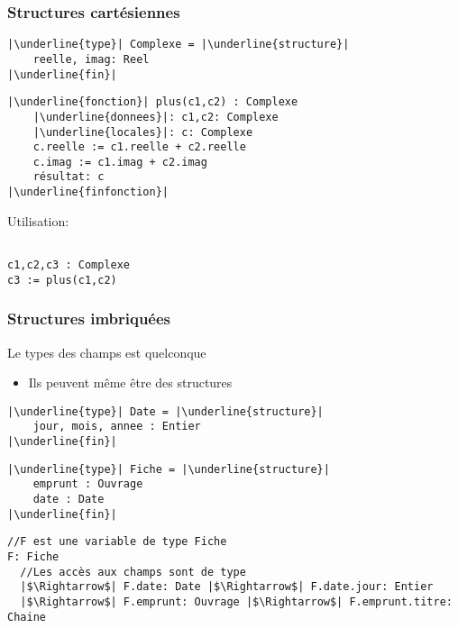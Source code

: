 \documentclass[table,handout,tikz,12pt,svgnames]{beamer}
\begin{document}
\begin{frame}[fragile=singleslide]
	\frametitle{Structures cartésiennes}
	\begin{verbatim}
|\underline{type}| Complexe = |\underline{structure}|
	reelle, imag: Reel
|\underline{fin}|
	\end{verbatim}
	\vspace{-0.9cm} \myline  \vspace{-0.7cm}	
	\begin{verbatim}
|\underline{fonction}| plus(c1,c2) : Complexe
	|\underline{donnees}|: c1,c2: Complexe
	|\underline{locales}|: c: Complexe
	c.reelle := c1.reelle + c2.reelle
	c.imag := c1.imag + c2.imag
	résultat: c
|\underline{finfonction}|
	\end{verbatim}			
	\vspace{-0.9cm} \myline  \vspace{-0.5cm}	
Utilisation:	
	\begin{verbatim}

c1,c2,c3 : Complexe
c3 := plus(c1,c2)
	\end{verbatim}			
\end{frame}


\begin{frame}[fragile=singleslide]
	\frametitle{Structures imbriquées}
	\begin{itemize}
		\vspace{-0.9cm}
	\end{itemize}
	\vspace{-1.1cm} \myline  \vspace{-1.4cm}
	\begin{block}{}
		\begin{verbatim}
//F est une variable de type Fiche
F: Fiche 
  //Les accès aux champs sont de type
  |$\Rightarrow$| F.date: Date |$\Rightarrow$| F.date.jour: Entier
  |$\Rightarrow$| F.emprunt: Ouvrage |$\Rightarrow$| F.emprunt.titre: Chaine
		\end{verbatim}
	\end{block}		
\end{frame}
\end{document}
